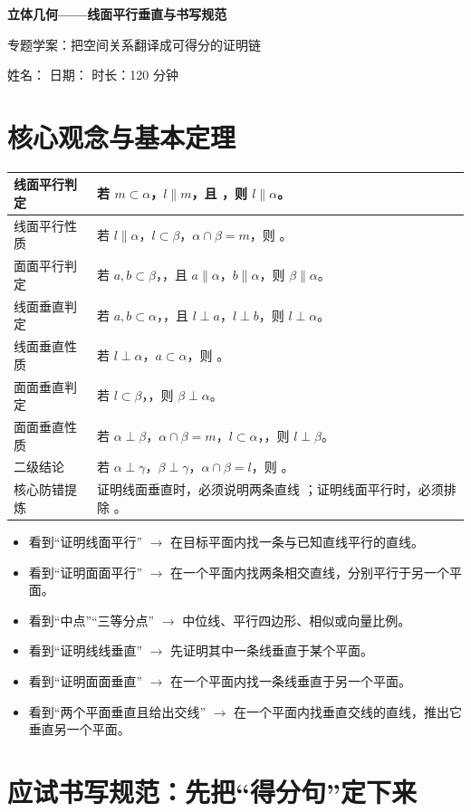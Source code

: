 \documentclass[11pt,a4paper]{ctexart}
\newcommand{\sessionformulas}{%
  \arrayrulecolor{rulecolor}
  \begin{tabularx}{\textwidth}{p{4.0cm}X}
  \toprule[1.2pt]
  线面平行判定 & 若 $m\subset\alpha$，$l\parallel m$，且 \fblank[2.2cm]{$l\not\subset\alpha$}，则 $l\parallel\alpha$。\\ \hline
  线面平行性质 & 若 $l\parallel\alpha$，$l\subset\beta$，$\alpha\cap\beta=m$，则 \fblank[2.2cm]{$l\parallel m$}。\\ \hline
  面面平行判定 & 若 $a,b\subset\beta$，\fblank[2.2cm]{$a\cap b=O$}，且 $a\parallel\alpha$，$b\parallel\alpha$，则 $\beta\parallel\alpha$。\\ \hline
  线面垂直判定 & 若 $a,b\subset\alpha$，\fblank[2.2cm]{$a\cap b=O$}，且 $l\perp a$，$l\perp b$，则 $l\perp\alpha$。\\ \hline
  线面垂直性质 & 若 $l\perp\alpha$，$a\subset\alpha$，则 \fblank[2.2cm]{$l\perp a$}。\\ \hline
  面面垂直判定 & 若 $l\subset\beta$，\fblank[2.2cm]{$l\perp\alpha$}，则 $\beta\perp\alpha$。\\ \hline
  面面垂直性质 & 若 $\alpha\perp\beta$，$\alpha\cap\beta=m$，$l\subset\alpha$，\fblank[2.2cm]{$l\perp m$}，则 $l\perp\beta$。\\ \hline
  二级结论 & 若 $\alpha\perp\gamma$，$\beta\perp\gamma$，$\alpha\cap\beta=l$，则 \fblank[2.2cm]{$l\perp\gamma$}。\\ \hline
  核心防错提炼 & 证明线面垂直时，必须说明两条直线 \fblank[2.5cm]{在目标平面内且相交}；证明线面平行时，必须排除 \fblank[2.5cm]{直线在平面内}。\\
  \bottomrule[1.2pt]
  \end{tabularx}
}
\begin{document}
\begin{center}
  {\Large\bfseries 立体几何——线面平行垂直与书写规范}\par
  \vspace{0.3em}
  {\large 专题学案：把空间关系翻译成可得分的证明链}\par
  \vspace{0.3em}
  姓名：\blank{2.6cm}
  \quad
  日期：\blank{2.6cm}
  \quad
  时长：120 分钟
\end{center}

\section{核心观念与基本定理}

\begingroup
\large
\renewcommand{\arraystretch}{1.55}
\linespread{1.35}\selectfont
\showpromptfalse
\sessionformulas
\endgroup

\vspace{0.8em}
\begin{tcolorbox}[enhanced,breakable,colback=white,colframe=rulecolor,boxrule=0.55pt,arc=1mm,left=1.4mm,right=1.4mm,top=1.1mm,bottom=1.1mm,title={看到条件，立刻想到什么},fonttitle=\bfseries]
\begin{itemize}[leftmargin=2em, itemsep=0.1em]
  \item 看到“证明线面平行” $\to$ 在目标平面内找一条与已知直线平行的直线。
  \item 看到“证明面面平行” $\to$ 在一个平面内找两条相交直线，分别平行于另一个平面。
  \item 看到“中点”“三等分点” $\to$ 中位线、平行四边形、相似或向量比例。
  \item 看到“证明线线垂直” $\to$ 先证明其中一条线垂直于某个平面。
  \item 看到“证明面面垂直” $\to$ 在一个平面内找一条线垂直于另一个平面。
  \item 看到“两个平面垂直且给出交线” $\to$ 在一个平面内找垂直交线的直线，推出它垂直另一个平面。
\end{itemize}
\end{tcolorbox}

\newpage

\section{应试书写规范：先把“得分句”定下来}
\end{document}
